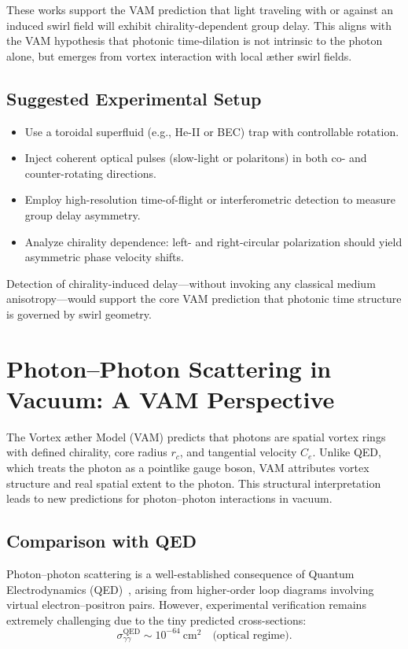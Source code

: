         These works support the VAM prediction that light traveling with or against an induced swirl field will exhibit chirality-dependent group delay. This aligns with the VAM hypothesis that photonic time-dilation is not intrinsic to the photon alone, but emerges from vortex interaction with local æther swirl fields.

        \subsection*{Suggested Experimental Setup}
        \begin{itemize}
            \item Use a toroidal superfluid (e.g., He-II or BEC) trap with controllable rotation.
            \item Inject coherent optical pulses (slow-light or polaritons) in both co- and counter-rotating directions.
            \item Employ high-resolution time-of-flight or interferometric detection to measure group delay asymmetry.
            \item Analyze chirality dependence: left- and right-circular polarization should yield asymmetric phase velocity shifts.
        \end{itemize}

        Detection of chirality-induced delay—without invoking any classical medium anisotropy—would support the core VAM prediction that photonic time structure is governed by swirl geometry.


\section{Photon–Photon Scattering in Vacuum: A VAM Perspective}\label{sec:photon-photon}

        The Vortex \ae ther Model (VAM) predicts that photons are spatial vortex rings with defined chirality, core radius \( r_c \), and tangential velocity \( C_e \). Unlike QED, which treats the photon as a pointlike gauge boson, VAM attributes vortex structure and real spatial extent to the photon. This structural interpretation leads to new predictions for photon–photon interactions in vacuum.

        \subsection{Comparison with QED}

                Photon–photon scattering is a well-established consequence of Quantum Electrodynamics (QED)~\cite{heisenberg1936,schwinger1951}, arising from higher-order loop diagrams involving virtual electron–positron pairs. However, experimental verification remains extremely challenging due to the tiny predicted cross-sections:
                \[
                    \sigma_{\gamma\gamma}^{\text{QED}} \sim 10^{-64}~\text{cm}^2 \quad \text{(optical regime)}.
                \]

